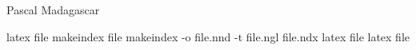 
\usepackage{index}

Pascal
Madagascar

\printindex %
\printindex[luoghi] %

latex file
makeindex file
makeindex -o file.nnd -t file.ngl file.ndx
latex file
latex file
